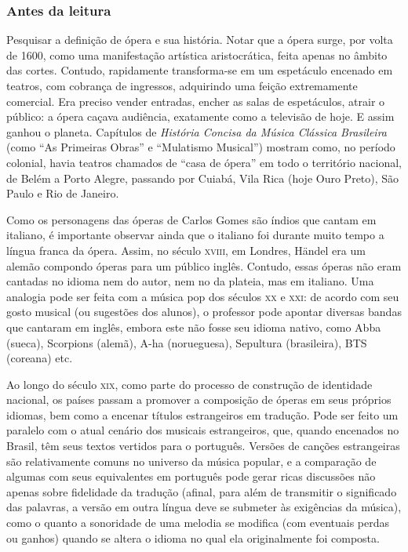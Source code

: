 \documentclass[11pt]{extarticle}
\begin{document}
\subsubsection{Antes da leitura}

Pesquisar a definição de ópera e sua história. Notar que a ópera surge, por
volta de 1600, como uma manifestação artística aristocrática, feita apenas no
âmbito das cortes. Contudo, rapidamente transforma-se em um espetáculo encenado
em teatros, com cobrança de ingressos, adquirindo uma feição extremamente
comercial. Era preciso vender entradas, encher as salas de espetáculos, atrair
o público: a ópera caçava audiência, exatamente como a televisão de hoje. E
assim ganhou o planeta. Capítulos de \emph{História Concisa da Música
Clássica Brasileira} (como ``As Primeiras Obras'' e ``Mulatismo Musical'') mostram como,
no período colonial, havia teatros chamados de “casa de ópera” em todo o
território nacional, de Belém a Porto Alegre, passando por Cuiabá, Vila Rica
(hoje Ouro Preto), São Paulo e Rio de Janeiro.

Como os personagens das óperas de Carlos Gomes são índios que cantam em
italiano, é importante observar ainda que o italiano foi durante muito tempo a
língua franca da ópera. Assim, no século \textsc{xviii}, em Londres, Händel era um
alemão compondo óperas para um público inglês. Contudo, essas óperas não eram
cantadas no idioma nem do autor, nem no da plateia, mas em italiano. Uma
analogia pode ser feita com a música pop dos séculos \textsc{xx} e \textsc{xxi}: de acordo com
seu gosto musical (ou sugestões dos alunos), o professor pode apontar diversas
bandas que cantaram em inglês, embora este não fosse seu idioma nativo, como
Abba (sueca), Scorpions (alemã), A-ha (norueguesa), Sepultura (brasileira), BTS
(coreana) etc. 

Ao longo do século \textsc{xix}, como parte do processo de construção de identidade
nacional, os países passam a promover a composição de óperas em seus próprios
idiomas, bem como a encenar títulos estrangeiros em tradução. Pode ser feito um
paralelo com o atual cenário dos musicais estrangeiros, que, quando encenados
no Brasil, têm seus textos vertidos para o português. Versões de canções
estrangeiras são relativamente comuns no universo da música popular, e a
comparação de algumas com seus equivalentes em português pode gerar ricas
discussões não apenas sobre fidelidade da tradução (afinal, para além de
transmitir o significado das palavras, a versão em outra língua deve se
submeter às exigências da música), como o quanto a sonoridade de uma melodia se
modifica (com eventuais perdas ou ganhos) quando se altera o idioma no qual ela
originalmente foi composta. 
\end{document}
